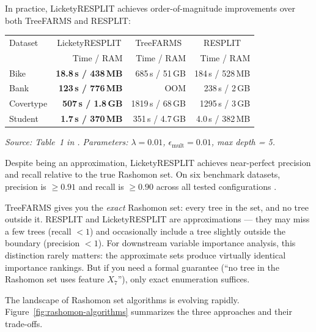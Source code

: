 In practice, LicketyRESPLIT achieves order-of-magnitude improvements over
both TreeFARMS and RESPLIT:

\begin{center}
\begin{tabular}{lrrr}
\toprule
Dataset & \multicolumn{1}{c}{LicketyRESPLIT} & \multicolumn{1}{c}{TreeFARMS} & \multicolumn{1}{c}{RESPLIT} \\
        & Time / RAM & Time / RAM & Time / RAM \\
\midrule
Bike       & \textbf{18.8\,s / 438\,MB} & 685\,s / 51\,GB & 184\,s / 528\,MB \\
Bank       & \textbf{123\,s / 776\,MB}   & OOM              & 238\,s / 2\,GB \\
Covertype  & \textbf{507\,s / 1.8\,GB}   & 1819\,s / 68\,GB & 1295\,s / 3\,GB \\
Student    & \textbf{1.7\,s / 370\,MB}   & 351\,s / 4.7\,GB & 4.0\,s / 382\,MB \\
\bottomrule
\end{tabular}
\end{center}
\emph{Source: Table~1 in \citet{HeileBabbar2025}.  Parameters: $\lambda = 0.01$,
$\epsilon_{\text{mult}} = 0.01$, max depth = 5.}

Despite being an approximation, LicketyRESPLIT achieves near-perfect
precision and recall relative to the true Rashomon set.  On six benchmark
datasets, precision is $\geq 0.91$ and recall is $\geq 0.90$ across all
tested configurations \citep{HeileBabbar2025}.

\begin{warning}
TreeFARMS gives you the \emph{exact} Rashomon set: every tree in the set, and
no tree outside it.  RESPLIT and LicketyRESPLIT are approximations --- they
may miss a few trees (recall $< 1$) and occasionally include a tree slightly
outside the boundary (precision $< 1$).  For downstream variable importance
analysis, this distinction rarely matters: the approximate sets produce
virtually identical importance rankings.  But if you need a formal guarantee
(``no tree in the Rashomon set uses feature $X_7$''), only exact enumeration
suffices.
\end{warning}

The landscape of Rashomon set algorithms is evolving rapidly.
Figure~\ref{fig:rashomon-algorithms} summarizes the three approaches and
their trade-offs.

